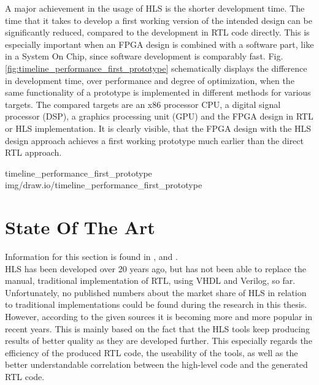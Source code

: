 A major achievement in the usage of HLS is the shorter development time.
The time that it takes to develop a first working version of the intended design can be significantly reduced, compared to the development in RTL code directly.
This is especially important when an FPGA design is combined with a software part, like in a System On Chip, since software development is comparably fast.
Fig.\ref{fig:timeline_performance_first_prototype} schematically displays the difference in development time, over performance and degree of optimization, when the same functionality of a prototype is implemented in different methods for various targets.
The compared targets are an x86 processor CPU, a digital signal processor (DSP), a graphics processing unit (GPU) and the FPGA design in RTL or HLS implementation.
It is clearly visible, that the FPGA design with the HLS design approach achieves a first working prototype much earlier than the direct RTL approach.

 {timeline_performance_first_prototype} {img/draw.io/timeline_performance_first_prototype}


\section{State Of The Art}

Information for this section is found in \cite{EvolutionOfHLS}, \cite{XilinxVivisHLSOpenSource} and \cite{CompareHlsVHDLArticle}.\\

HLS has been developed over 20 years ago, but has not been able to replace the manual, traditional implementation of RTL, using VHDL and Verilog, so far.
Unfortunately, no published numbers about the market share of HLS in relation to traditional implementations could be found during the research in this thesis.
However, according to the given sources it is becoming more and more popular in recent years.
This is mainly based on the fact that the HLS tools keep producing results of better quality as they are developed further.
This especially regards the efficiency of the produced RTL code, the useability of the tools, as well as the better understandable correlation between the high-level code and the generated RTL code.\\

